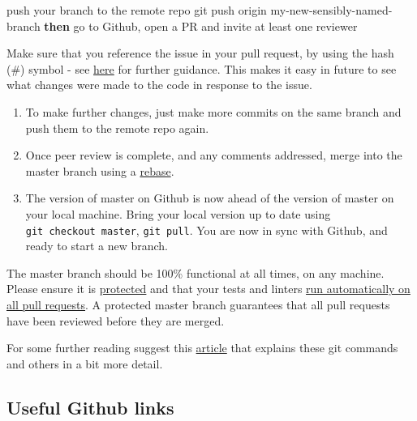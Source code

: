 \documentclass[]{book}
\newenvironment{Shaded}{\begin{snugshade}}{\end{snugshade}}
\newcommand{\ExtensionTok}[1]{#1}
\newcommand{\FunctionTok}[1]{\textcolor[rgb]{0.00,0.00,0.00}{#1}}
\newcommand{\KeywordTok}[1]{\textcolor[rgb]{0.13,0.29,0.53}{\textbf{#1}}}
\newcommand{\NormalTok}[1]{#1}
\begin{document}
\begin{Shaded}
\begin{Highlighting}[]
\ExtensionTok{push}\NormalTok{ your branch to the remote repo}
\FunctionTok{git}\NormalTok{ push origin my-new-sensibly-named-branch}
\KeywordTok{then} \ExtensionTok{go}\NormalTok{ to Github, open a PR and invite at least one reviewer}
\end{Highlighting}
\end{Shaded}

Make sure that you reference the issue in your pull request, by using the hash (\#) symbol - see \href{https://help.github.com/articles/autolinked-references-and-urls/}{here} for further guidance. This makes it easy in future to see what changes were made to the code in response to the issue.

\begin{enumerate}
\def\labelenumi{\arabic{enumi}.}
\setcounter{enumi}{5}
\item
  To make further changes, just make more commits on the same branch and push them to the remote repo again.
\item
  Once peer review is complete, and any comments addressed, merge into the master branch using a \href{https://github.com/blog/2243-rebase-and-merge-pull-requests}{rebase}.
\item
  The version of master on Github is now ahead of the version of master on your local machine. Bring your local version up to date using \texttt{git\ checkout\ master}, \texttt{git\ pull}. You are now in sync with Github, and ready to start a new branch.
\end{enumerate}

The master branch should be 100\% functional at all times, on any machine. Please ensure it is \href{https://help.github.com/articles/about-protected-branches/}{protected} and that your tests and linters \href{https://help.github.com/en/actions/automating-your-workflow-with-github-actions}{run automatically on all pull requests}. A protected master branch guarantees that all pull requests have been reviewed before they are merged.

For some further reading suggest this \href{https://gist.github.com/blackfalcon/8428401}{article} that explains these git commands and others in a bit more detail.

\hypertarget{gitlink}{%
\subsection*{Useful Github links}\label{gitlink}}
\end{document}

